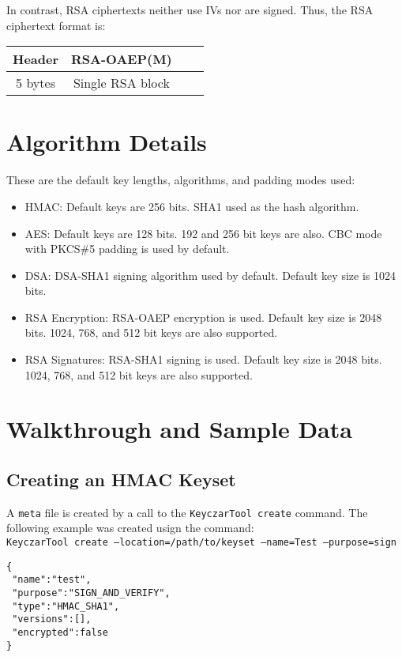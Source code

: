 \documentclass{llncs}
\begin{document}
In contrast, RSA ciphertexts neither use IVs nor are signed. Thus, the RSA
ciphertext format is:

\vspace*{3mm}
\begin{tabular}{| c | c | c | c |}
\hline
Header & RSA-OAEP(M)  \\ \hline
5 bytes & Single RSA block  \\
\hline
\end{tabular}
\vspace*{3mm}

\section{Algorithm Details}

These are the default key lengths, algorithms, and padding modes used:

\begin{itemize}
  \item HMAC: Default keys are 256 bits. SHA1 used as the hash
  algorithm.
  \item AES: Default keys are 128 bits. 192 and 256 bit keys are also. CBC mode
  with PKCS\#5 padding is used by default.
  \item DSA: DSA-SHA1 signing algorithm used by default. Default key size is
  1024 bits.
  \item RSA Encryption: RSA-OAEP encryption is used. Default key size is 2048
  bits. 1024, 768, and 512 bit keys are also supported.
  \item RSA Signatures: RSA-SHA1 signing is used. Default key size is 2048
  bits. 1024, 768, and 512 bit keys are also supported.
\end{itemize}


\section{Walkthrough and Sample Data}\label{walkthrough}

\subsection{Creating an HMAC Keyset}
A {\tt meta} file is created by a call to the {\tt KeyczarTool create} command.
The following example was created usign the command: \\
{\tt KeyczarTool create --location=/path/to/keyset --name=Test --purpose=sign}

\begin{verbatim}
{
 "name":"test",
 "purpose":"SIGN_AND_VERIFY",
 "type":"HMAC_SHA1",
 "versions":[],
 "encrypted":false
}
\end{verbatim}
\end{document}
